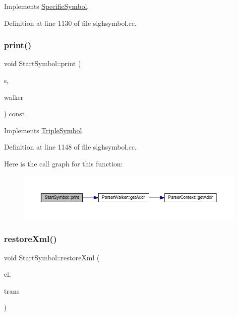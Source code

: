 Implements \mbox{\hyperlink{class_specific_symbol_abbde46a1f6af6c373420773d45e1e4e2}{Specific\+Symbol}}.



Definition at line 1130 of file slghsymbol.\+cc.

\mbox{\label{class_start_symbol_a973289b5a20d276346089365cc24905f}} 
\subsubsection{\texorpdfstring{print()}{print()}}
{\footnotesize\ttfamily void Start\+Symbol\+::print (\begin{DoxyParamCaption}\item[{ostream \&}]{s,  }\item[{\mbox{\hyperlink{class_parser_walker}{Parser\+Walker}} \&}]{walker }\end{DoxyParamCaption}) const\hspace{0.3cm}{\ttfamily [virtual]}}



Implements \mbox{\hyperlink{class_triple_symbol_a205c4487d3ad54532097dd77eb4501fc}{Triple\+Symbol}}.



Definition at line 1148 of file slghsymbol.\+cc.

Here is the call graph for this function\+:
\nopagebreak
\begin{figure}[H]
\begin{center}
\leavevmode
\includegraphics[width=350pt]{class_start_symbol_a973289b5a20d276346089365cc24905f_cgraph}
\end{center}
\end{figure}
\mbox{\label{class_start_symbol_a8bffa932c38139afeacdafdbb8611c2f}} 
\subsubsection{\texorpdfstring{restoreXml()}{restoreXml()}}
{\footnotesize\ttfamily void Start\+Symbol\+::restore\+Xml (\begin{DoxyParamCaption}\item[{const \mbox{\hyperlink{class_element}{Element}} $\ast$}]{el,  }\item[{\mbox{\hyperlink{class_sleigh_base}{Sleigh\+Base}} $\ast$}]{trans }\end{DoxyParamCaption})\hspace{0.3cm}{\ttfamily [virtual]}}



